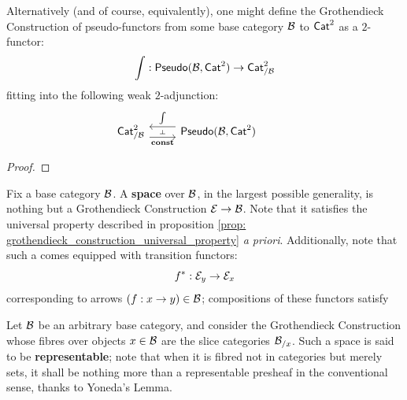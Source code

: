                 \begin{proposition} \label{prop: grothendieck_construction_universal_property}
                    Alternatively (and of course, equivalently), one might define the Grothendieck Construction of pseudo-functors from some base category $\mathcal{B}$ to $\mathsf{Cat}^2$ as a $2$-functor:
                        $$\int: \mathsf{Pseudo}(\mathcal{B}, \mathsf{Cat}^2) \to \mathsf{Cat}^2_{/\mathcal{B}}$$
                    fitting into the following weak $2$-adjunction:
                        $$
                            \begin{tikzcd}
                            	{\Cat^2_{/\calB}} & {\Pseudo(\calB, \Cat^2)} & {}
                            	\arrow[""{name=0, anchor=center, inner sep=0}, "\const"', shift right=2, from=1-1, to=1-2]
                            	\arrow[""{name=1, anchor=center, inner sep=0}, "\int"', shift right=2, from=1-2, to=1-1]
                            	\arrow["\dashv"{anchor=center, rotate=-90}, draw=none, from=1, to=0]
                            \end{tikzcd}
                        $$
                \end{proposition}
                    \begin{proof}
                        
                    \end{proof}
                \begin{corollary} \label{coro: grothendieck_constructions_are_oplax_colimits}
                    
                \end{corollary}
                
                \begin{definition}[Spaces] \label{def: spaces}
                    Fix a base category $\mathcal{B}$. A \textbf{space} over $\mathcal{B}$, in the largest possible generality, is nothing but a Grothendieck Construction $\mathcal{E} \to \mathcal{B}$. Note that it satisfies the universal property described in proposition \ref{prop: grothendieck_construction_universal_property} \textit{a priori}. Additionally, note that such a  comes equipped with transition functors:
                        $$f^*: \mathcal{E}_y \to \mathcal{E}_x$$
                    corresponding to arrows $(f: x \to y) \in \mathcal{B}$; compositions of these functors satisfy 
                \end{definition}
                \begin{example} \label{exmaple: representable_spaces}
                    Let $\mathcal{B}$ be an arbitrary base category, and consider the Grothendieck Construction whose fibres over objects $x \in \mathcal{B}$ are the slice categories $\mathcal{B}_{/x}$. Such a space is said to be \textbf{representable}; note that when it is fibred not in categories but merely sets, it shall be nothing more than a representable presheaf in the conventional sense, thanks to Yoneda's Lemma.
                \end{example}
                
